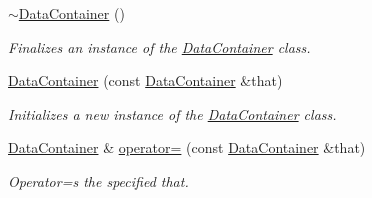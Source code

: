 \begin{DoxyCompactItemize}
\hyperlink{class_n_n_t_lib_1_1_data_container_ace6c0c0f2af211f30214fe2605c72734}{$\sim$\+Data\+Container} ()
\begin{DoxyCompactList}\small\item\em Finalizes an instance of the \hyperlink{class_n_n_t_lib_1_1_data_container}{Data\+Container} class. \end{DoxyCompactList}\item 
\hyperlink{class_n_n_t_lib_1_1_data_container_a0b15f3375a93edf3c77edf9bb469ae30}{Data\+Container} (const \hyperlink{class_n_n_t_lib_1_1_data_container}{Data\+Container} \&that)
\begin{DoxyCompactList}\small\item\em Initializes a new instance of the \hyperlink{class_n_n_t_lib_1_1_data_container}{Data\+Container} class. \end{DoxyCompactList}\item 
\hyperlink{class_n_n_t_lib_1_1_data_container}{Data\+Container} \& \hyperlink{class_n_n_t_lib_1_1_data_container_ac3be801bc4609c2cf47f2ae57126b42a}{operator=} (const \hyperlink{class_n_n_t_lib_1_1_data_container}{Data\+Container} \&that)
\begin{DoxyCompactList}\small\item\em Operator=s the specified that. \end{DoxyCompactList}\end{DoxyCompactItemize}
